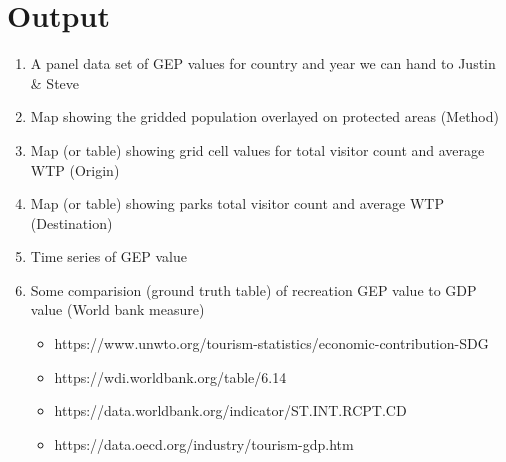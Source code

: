\documentclass[
  letterpaper,
  DIV=11,
  numbers=noendperiod]{scrartcl}
\providecommand{\tightlist}{%
  \setlength{\itemsep}{0pt}\setlength{\parskip}{0pt}}\usepackage{longtable,booktabs,array}
\begin{document}
\hypertarget{output}{%
\section{Output}\label{output}}

\begin{enumerate}
\def\labelenumi{\arabic{enumi}.}
\tightlist
\item
  A panel data set of GEP values for country and year we can hand to
  Justin \& Steve
\item
  Map showing the gridded population overlayed on protected areas
  (Method)
\item
  Map (or table) showing grid cell values for total visitor count and
  average WTP (Origin)
\item
  Map (or table) showing parks total visitor count and average WTP
  (Destination)
\item
  Time series of GEP value
\item
  Some comparision (ground truth table) of recreation GEP value to GDP
  value (World bank measure)

  \begin{itemize}
  \tightlist
  \item
    https://www.unwto.org/tourism-statistics/economic-contribution-SDG
  \item
    https://wdi.worldbank.org/table/6.14
  \item
    https://data.worldbank.org/indicator/ST.INT.RCPT.CD
  \item
    https://data.oecd.org/industry/tourism-gdp.htm
  \end{itemize}
\end{enumerate}
\end{document}
